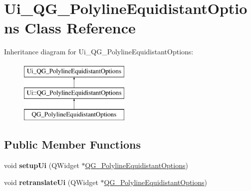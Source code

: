 \hypertarget{classUi__QG__PolylineEquidistantOptions}{\section{Ui\-\_\-\-Q\-G\-\_\-\-Polyline\-Equidistant\-Options Class Reference}
\label{classUi__QG__PolylineEquidistantOptions}
}
Inheritance diagram for Ui\-\_\-\-Q\-G\-\_\-\-Polyline\-Equidistant\-Options\-:\begin{figure}[H]
\begin{center}
\leavevmode
\includegraphics[height=3.000000cm]{classUi__QG__PolylineEquidistantOptions}
\end{center}
\end{figure}
\subsection*{Public Member Functions}
\begin{DoxyCompactItemize}
\item 
\hypertarget{classUi__QG__PolylineEquidistantOptions_a3e6ced42c4475014cd8f09947e2b1978}{void {\bfseries setup\-Ui} (Q\-Widget $\ast$\hyperlink{classQG__PolylineEquidistantOptions}{Q\-G\-\_\-\-Polyline\-Equidistant\-Options})}\label{classUi__QG__PolylineEquidistantOptions_a3e6ced42c4475014cd8f09947e2b1978}

\item 
\hypertarget{classUi__QG__PolylineEquidistantOptions_a3cd6449330c22319783714002918b33b}{void {\bfseries retranslate\-Ui} (Q\-Widget $\ast$\hyperlink{classQG__PolylineEquidistantOptions}{Q\-G\-\_\-\-Polyline\-Equidistant\-Options})}\label{classUi__QG__PolylineEquidistantOptions_a3cd6449330c22319783714002918b33b}

\end{DoxyCompactItemize}
